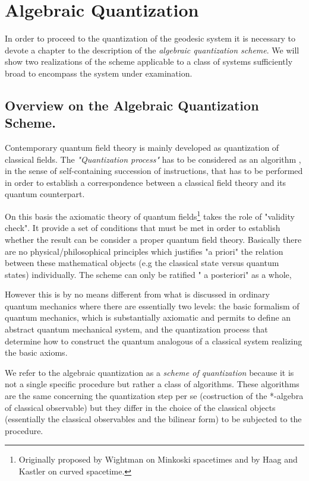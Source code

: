 \documentclass[Main]{subfiles}
\begin{document}
\chapter{Algebraic Quantization}
In order to proceed to the quantization of the geodesic system  it is necessary to devote a chapter to the description of the \emph{algebraic quantization scheme}.
We will show two realizations of the scheme applicable to a class of systems sufficiently broad to encompass the system under examination.

\section{Overview on the Algebraic Quantization Scheme.}
Contemporary quantum field theory is mainly developed as quantization of classical fields.
The \emph{"Quantization process"} has to be considered as an algorithm , in the sense of self-containing succession of instructions, that has to be performed in order to establish a correspondence between a classical field theory and its quantum counterpart.

On this basis the axiomatic theory of quantum fields\footnote{Originally proposed by Wightman on Minkoski spacetimes and by Haag and Kastler on curved spacetime.} takes the role of "validity check". It provide a set of conditions that must be met in order to establish whether the result can be consider a proper quantum field theory.
Basically there are no physical/philosophical principles which justifies "a priori" the relation between these  mathematical objects (e.g the classical state versus quantum states) individually. The scheme can only be ratified " a posteriori" as a whole,%

However this is by no means different from what is discussed in ordinary quantum mechanics where there are essentially two levels:
the basic formalism of quantum mechanics, which is substantially axiomatic and permits to define an abstract quantum mechanical system, and the quantization process that determine how to construct the quantum analogous of a classical system realizing the basic axioms.

We refer to the algebraic quantization as a \emph{scheme of quantization} because it is not a single specific procedure but rather a class of algorithms.
These algorithms are the same concerning the quantization step per se (costruction of the *-algebra of classical observable) but they differ in the choice of the classical objects  (essentially the classical observables and the bilinear form) to be subjected to the procedure.
\end{document}
